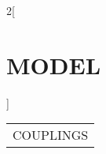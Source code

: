 \documentclass[11pt,twoside]{article}
\begin{document}
\begin{landscape}

\begin{minipage}{25cm}

\begin{large}
\begin{multicols}{2}[\section*{MODEL}]
\end{multicols}
\end{large}

\end{minipage}

\clearpage

\renewcommand{\arraystretch}{1.5}

\begin{longtable}{p{.985\linewidth}}
COUPLINGS
\end{longtable}

\end{landscape}
\end{document}

